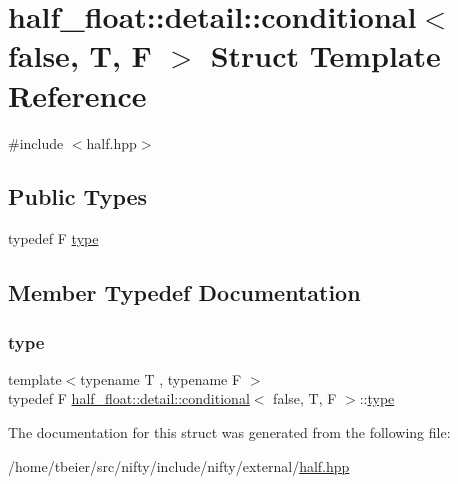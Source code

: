 \hypertarget{structhalf__float_1_1detail_1_1conditional_3_01false_00_01T_00_01F_01_4}{}\section{half\+\_\+float\+:\+:detail\+:\+:conditional$<$ false, T, F $>$ Struct Template Reference}
\label{structhalf__float_1_1detail_1_1conditional_3_01false_00_01T_00_01F_01_4}


{\ttfamily \#include $<$half.\+hpp$>$}

\subsection*{Public Types}
\begin{DoxyCompactItemize}
\item 
typedef F \hyperlink{structhalf__float_1_1detail_1_1conditional_3_01false_00_01T_00_01F_01_4_ac15c7cd8869102e198302214fc278630}{type}
\end{DoxyCompactItemize}


\subsection{Member Typedef Documentation}
\mbox{\label{structhalf__float_1_1detail_1_1conditional_3_01false_00_01T_00_01F_01_4_ac15c7cd8869102e198302214fc278630}} 
\subsubsection{\texorpdfstring{type}{type}}
{\footnotesize\ttfamily template$<$typename T , typename F $>$ \\
typedef F \hyperlink{structhalf__float_1_1detail_1_1conditional}{half\+\_\+float\+::detail\+::conditional}$<$ false, T, F $>$\+::\hyperlink{structhalf__float_1_1detail_1_1conditional_3_01false_00_01T_00_01F_01_4_ac15c7cd8869102e198302214fc278630}{type}}



The documentation for this struct was generated from the following file\+:\begin{DoxyCompactItemize}
\item 
/home/tbeier/src/nifty/include/nifty/external/\hyperlink{half_8hpp}{half.\+hpp}\end{DoxyCompactItemize}
